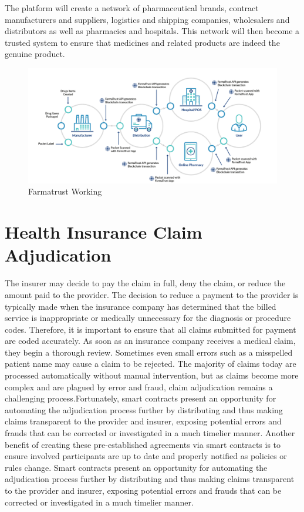 \documentclass[12pt]{report}
\begin{document}
The platform will create a network of pharmaceutical brands, contract manufacturers and suppliers, logistics and shipping companies, wholesalers and distributors as well as pharmacies and hospitals. This network will then become a trusted system to ensure that medicines and related products are indeed the genuine product.
\begin{figure}[H]
\centering
\includegraphics[width=1.0\textwidth]{farma.png}
\caption{Farmatrust Working}
\label{farmatrust}
\end{figure}


\section{Health Insurance Claim Adjudication}
\par The insurer may decide to pay the claim in full, deny the claim, or reduce the amount
paid to the provider. The decision to reduce a payment to the provider is typically made when
the insurance company has determined that the billed service is inappropriate or medically
unnecessary for the diagnosis or procedure codes. Therefore, it is important to ensure that all
claims submitted for payment are coded accurately. As soon as an insurance company receives a medical claim, they begin a thorough review. Sometimes even small errors such as a misspelled patient name may cause a claim to be rejected. The majority of claims today
are processed automatically without manual intervention, but as claims become more complex and are plagued by error and fraud, claim adjudication remains a challenging process.Fortunately, smart contracts present
an opportunity for automating the adjudication process further by distributing and thus making claims transparent to the provider and insurer, exposing potential errors and frauds that
can be corrected or investigated in a much timelier manner. Another benefit of creating these
pre-established agreements via smart contracts is to ensure involved participants are up to date and properly notified as policies or rules change.
Smart contracts present
an opportunity for automating the adjudication process further by distributing and thus making claims transparent to the provider and insurer, exposing potential errors and frauds that
can be corrected or investigated in a much timelier manner.
\end{document}
